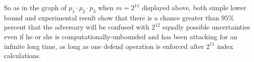 \documentclass[10pt, conference, compsocconf]{IEEEtran}
\begin{document}
    So as in the graph of $p_1 \cdot p_2 \cdot p_3$ when
    $m = 2^{11}$ displayed above, both simple lower
    bound and experimental result show that
    there is a chance greater than $95\%$ percent that the adversary
    will be confused with $2^{12}$ equally possible uncertainties
    even if he or she is computationally-unbounded and has been attacking
    for an infinite long time, as long as one defend operation is enforced
    after $2^{11}$ index calculations.

%
%



%
%
\end{document}
